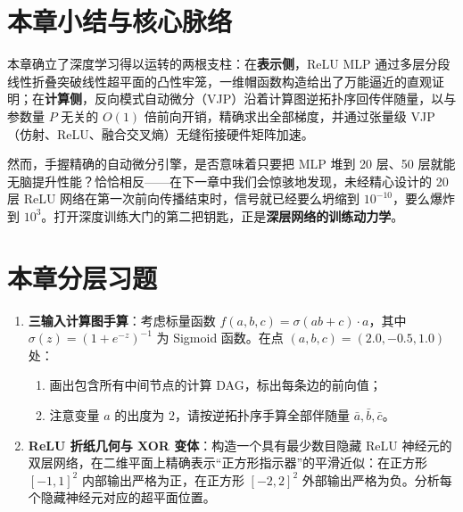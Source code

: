 \section*{本章小结与核心脉络}

本章确立了深度学习得以运转的两根支柱：在\textbf{表示侧}，ReLU MLP 通过多层分段线性折叠突破线性超平面的凸性牢笼，一维帽函数构造给出了万能逼近的直观证明；在\textbf{计算侧}，反向模式自动微分（VJP）沿着计算图逆拓扑序回传伴随量，以与参数量 $P$ 无关的 $O(1)$ 倍前向开销，精确求出全部梯度，并通过张量级 VJP（仿射、ReLU、融合交叉熵）无缝衔接硬件矩阵加速。

然而，手握精确的自动微分引擎，是否意味着只要把 MLP 堆到 20 层、50 层就能无脑提升性能？恰恰相反——在下一章中我们会惊骇地发现，未经精心设计的 20 层 ReLU 网络在第一次前向传播结束时，信号就已经要么坍缩到 $10^{-10}$，要么爆炸到 $10^3$。打开深度训练大门的第二把钥匙，正是\textbf{深层网络的训练动力学}。

\section*{本章分层习题}


\begin{enumerate}
  \item[\textbf{5.1.1}] \textbf{三输入计算图手算}：考虑标量函数 $f(a, b, c) = \sigma(a b + c) \cdot a$，其中 $\sigma(z) = (1 + e^{-z})^{-1}$ 为 Sigmoid 函数。在点 $(a, b, c) = (2.0, -0.5, 1.0)$ 处：
  \begin{enumerate}
    \item 画出包含所有中间节点的计算 DAG，标出每条边的前向值；
    \item 注意变量 $a$ 的出度为 $2$，请按逆拓扑序手算全部伴随量 $\bar{a}, \bar{b}, \bar{c}$。
  \end{enumerate}

  \item[\textbf{5.1.2}] \textbf{ReLU 折纸几何与 XOR 变体}：构造一个具有最少数目隐藏 ReLU 神经元的双层网络，在二维平面上精确表示“正方形指示器”的平滑近似：在正方形 $[-1, 1]^2$ 内部输出严格为正，在正方形 $[-2, 2]^2$ 外部输出严格为负。分析每个隐藏神经元对应的超平面位置。
\end{enumerate}

